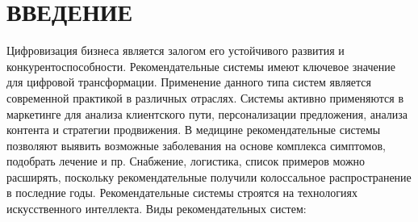 \chapter*{ВВЕДЕНИЕ}

Цифровизация бизнеса является залогом его устойчивого развития и
конкурентоспособности.
Рекомендательные системы имеют ключевое
значение для цифровой трансформации.
Применение данного типа систем
является современной практикой в различных отраслях.
Системы активно применяются в маркетинге для анализа клиентского пути, персонализации
предложения, анализа контента и стратегии продвижения.
В медицине рекомендательные системы позволяют выявить возможные заболевания на
основе комплекса симптомов, подобрать лечение и пр.
Снабжение, логистика, список примеров можно расширять, поскольку рекомендательные
получили колоссальное распространение в последние годы.
Рекомендательные системы строятся на технологиях искусственного интеллекта.
Виды рекомендательных систем:
